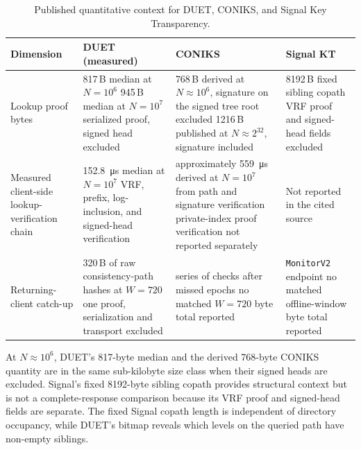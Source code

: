\begin{table}[htbp]
\centering
\caption{Published quantitative context for DUET, CONIKS, and Signal Key Transparency.}
\label{tab:eval-compare}
\small
\begin{tabularx}{\textwidth}{@{}>{\raggedright\arraybackslash}p{2.4cm}
>{\raggedright\arraybackslash}X
>{\raggedright\arraybackslash}X
>{\raggedright\arraybackslash}X@{}}
\toprule
Dimension & DUET (measured) &
CONIKS~\cite[Sections~4.1.3 and 5.3]{melara2015coniks} &
Signal KT~\cite{signal-kt-server} \\
\midrule

Lookup proof bytes &
\num{817}\,B median at $N=10^6$\newline
\num{945}\,B median at $N=10^7$\newline
serialized proof, signed head excluded &
\num{768}\,B derived at $N\approx10^6$, signature on the signed tree root excluded\newline
\num{1216}\,B published at $N\approx2^{32}$, signature included &
\num{8192}\,B fixed sibling copath\newline
VRF proof and signed-head fields excluded \\

Measured client-side lookup-verification chain &
\SI{152.8}{\micro\second} median at $N=10^7$\newline
VRF, prefix, log-inclusion, and signed-head verification &
approximately \SI{559}{\micro\second} derived at $N=10^7$ from path and
signature verification\newline
private-index proof verification not reported separately &
Not reported in the cited source \\

Returning-client catch-up &
\num{320}\,B of raw consistency-path hashes at $W=720$\newline
one proof, serialization and transport excluded &
series of checks after missed epochs\newline
no matched $W=720$ byte total reported &
\texttt{MonitorV2} endpoint\newline
no matched offline-window byte total reported \\

\bottomrule
\end{tabularx}
\end{table}

At $N\approx10^6$, DUET's \num{817}-byte median and the derived
\num{768}-byte CONIKS quantity are in the same sub-kilobyte size class when their signed heads are
excluded. Signal's fixed \num{8192}-byte sibling copath provides structural context but is not a
complete-response comparison because its VRF proof and signed-head fields are separate. The fixed
Signal copath length is independent of directory occupancy, while DUET's bitmap reveals which
levels on the queried path have non-empty siblings.

